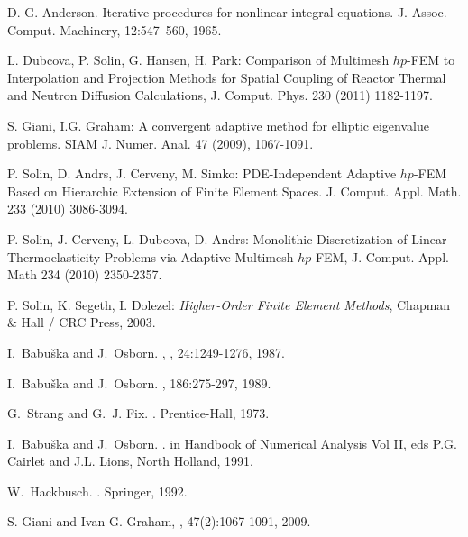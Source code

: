 \documentclass[preprint,12pt]{elsarticle}
\begin{document}
\begin{thebibliography}{[KLR73]}

D. G. Anderson. Iterative procedures for nonlinear integral equations. J. Assoc. Comput.
Machinery, 12:547–560, 1965.

L. Dubcova, P. Solin, G. Hansen, H. Park: Comparison of Multimesh $hp$-FEM 
to Interpolation and Projection Methods for Spatial Coupling of Reactor 
Thermal and Neutron Diffusion Calculations, J. Comput. Phys. 230 (2011) 1182-1197.

S. Giani, I.G. Graham: A convergent adaptive method for elliptic eigenvalue 
problems. SIAM J. Numer. Anal. 47 (2009), 1067-1091.

P. Solin, D. Andrs, J. Cerveny, M. Simko: 
PDE-Independent Adaptive $hp$-FEM Based on Hierarchic Extension of Finite Element Spaces.
J. Comput. Appl. Math. 233 (2010) 3086-3094.

P. Solin, J. Cerveny, L. Dubcova, D. Andrs: Monolithic Discretization of Linear 
Thermoelasticity Problems via Adaptive Multimesh $hp$-FEM, J. Comput. Appl. Math 
234 (2010) 2350-2357.

P. Solin, K. Segeth, I. Dolezel: {\em Higher-Order Finite Element Methods},
Chapman \& Hall / CRC Press, 2003.

I.~Babu\v{s}ka and J.~Osborn.
, 
, 24:1249-1276, 1987.

I.~Babu\v{s}ka and J.~Osborn.
, 
 186:275-297, 1989.
 
G.~Strang and G.~J. Fix.
.
\newblock Prentice-Hall, 1973.

I.~Babu\v{s}ka and J.~Osborn.
.
\newblock in Handbook of Numerical Analysis Vol II, eds P.G. Cairlet and J.L. Lions, North Holland, 1991.

W.~Hackbusch.
.
\newblock Springer, 1992.

S. Giani and Ivan G. Graham,
,
 47(2):1067-1091, 2009.


\end{thebibliography}
\end{document}
